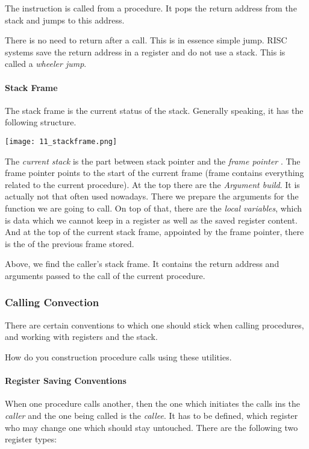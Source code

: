 The instruction  is called from a procedure. It pops the return address from the stack and jumps to this address.

There is no need to return after a call. This is in essence simple jump. RISC systems save the return address in a register and do not use a stack. This is called a \textit{wheeler jump}.

\paragraph{Stack Frame}
The stack frame is the current status of the stack. Generally speaking, it has the following structure.

\texttt{[image: 11\_stackframe.png]}

The \textit{current stack} is the part between stack pointer and the \textit{frame pointer} . The frame pointer points to the start of the current frame (frame contains everything related to the current procedure). At the top there are the \textit{Argument build}. It is actually not that often used nowadays. There we prepare the arguments for the function we are going to call. On top of that, there are the \textit{local variables}, which is data which we cannot keep in a register as well as the saved register content. And at the top of the current stack frame, appointed by the frame pointer, there is the  of the previous frame stored.

Above, we find the caller's stack frame. It contains the return address and arguments passed to the call of the current procedure.

\subsubsection{Calling Convection}
There are certain conventions to which one should stick when calling procedures, and working with registers and the stack.

How do you construction procedure calls using these utilities.

\paragraph{Register Saving Conventions}
When one procedure calls another, then the one which initiates the calls ins the \textit{caller} and the one being called is the \textit{callee}. It has to be defined, which register who may change one which should stay untouched. There are the following two register types:

